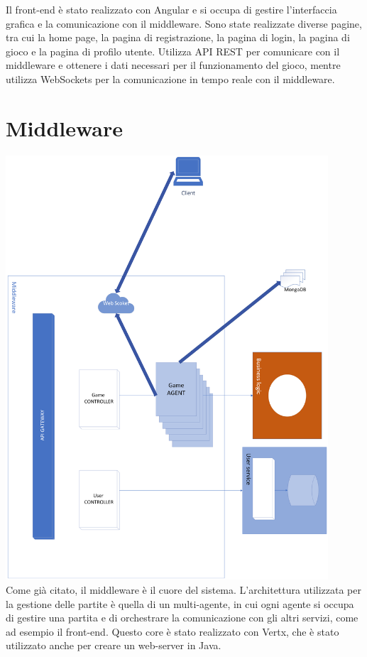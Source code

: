 Il front-end è stato realizzato con Angular e si occupa di gestire l'interfaccia grafica e la comunicazione con il middleware.
Sono state realizzate diverse pagine, tra cui la home page, la pagina di registrazione, la pagina di login, la pagina di gioco e la pagina di profilo utente.
Utilizza API REST per comunicare con il middleware e ottenere i dati necessari per il funzionamento del gioco, mentre utilizza WebSockets per la comunicazione in tempo reale con il middleware. 


\section{Middleware}


\includegraphics[width=12cm]{report/img/middleware.png}\\[10.5cm]

Come già citato, il middleware è il cuore del sistema. L'architettura utilizzata per la gestione delle partite è quella di un multi-agente, in cui ogni agente si occupa di gestire una partita 
e di orchestrare la comunicazione con gli altri servizi, come ad esempio il front-end. Questo core è stato realizzato con Vertx, che è stato utilizzato anche per creare un web-server in Java.

